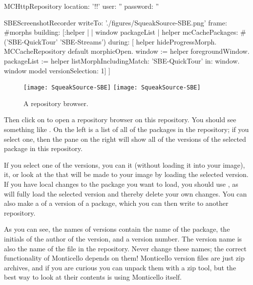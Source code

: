 \documentclass[a4paper,10pt,twoside]{book}
\begin{document}
\begin{code}{}
MCHttpRepository
	location: '!\sbeSqueaksourceUrl!'
	user: ''
	password: ''
\end{code}

\begin{ExecuteSmalltalkScript}
SBEScreenshotRecorder writeTo: './figures/SqueakSource-SBE.png' frame: #morphs building: [:helper |
	| window packageList |
	helper mcCachePackages: #('SBE-QuickTour' 'SBE-Streams') during: [
		helper hideProgressMorph.
		MCCacheRepository default morphicOpen.
		window := helper foregroundWindow.
		packageList := helper listMorphIncludingMatch: 'SBE-QuickTour' in: window.
		window model versionSelection: 1]
]
\end{ExecuteSmalltalkScript}
\begin{figure}[btp]
	\begin{center}
	\ifluluelse
		{\texttt{[image: SqueakSource-SBE]}}
		{\texttt{[image: SqueakSource-SBE]}}
	\end{center}
	\caption{A repository browser.}
	\label{fig:SqueakSource:SBE}
\end{figure}
\noindent
Then click on  to open a repository browser on this repository.
You should see something like .
On the left is a list of all of the packages in the repository; if you select one, then the pane on the right will show all of the versions of the selected package in this repository.

If you select one of the versions, you can  it (without loading it into your image),  it, or look at the  that will be made to your image by loading the selected version.
If you have local changes to the package you want to load, you should use , as  will fully load the selected version and thereby delete your own changes.
You can also make a  of a version of a package, which you can then write to another repository.

As you can see, the names of versions contain the name of the package, the initials of the author of the version, and a version number.
The version name is also the name of the file in the repository.
Never change these names; the correct functionality of Monticello depends on them!
Monticello version files are just zip archives, and if you are curious you can unpack them with a zip tool, but the best way to look at their contents is using Monticello itself.
\end{document}

